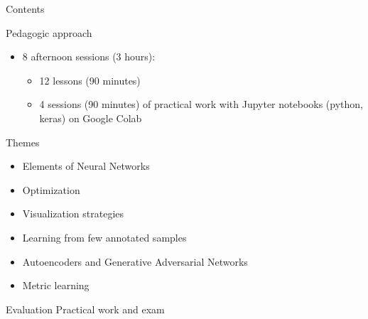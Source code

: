 \documentclass[xcolor=pdftex,dvipsnames,table,mathserif]{beamer}
\begin{document}
\begin{frame}{Contents}


\begin{block}{Pedagogic approach}

  \begin{itemize}
  \item 8 afternoon sessions (3 hours):
    \begin{itemize}
    \item 12 lessons (90 minutes)
    \item 4 sessions (90 minutes) of practical work with Jupyter notebooks (python, keras) on Google Colab
    \end{itemize}
  \end{itemize}
\end{block}

\begin{block}{Themes}
\begin{itemize}
\item Elements of Neural Networks
\item Optimization
\item Visualization strategies
\item Learning from few annotated samples
\item Autoencoders and Generative Adversarial Networks
\item Metric learning
\end{itemize}
\end{block}

  \begin{block}{Evaluation}
  Practical work and exam
  \end{block}

\end{frame}


\end{document}
